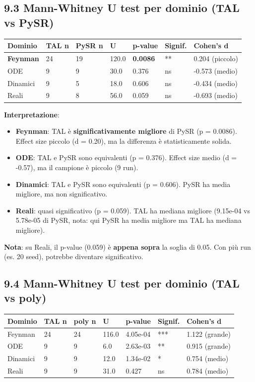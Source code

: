 \documentclass[
]{article}
\providecommand{\tightlist}{%
  \setlength{\itemsep}{0pt}\setlength{\parskip}{0pt}}
\begin{document}
\subsection{9.3 Mann-Whitney U test per dominio (TAL vs
PySR)}\label{mann-whitney-u-test-per-dominio-tal-vs-pysr}

\begin{longtable}[]{@{}lllllll@{}}
\toprule\noalign{}
Dominio & TAL n & PySR n & U & p-value & Signif. & Cohen's d \\
\midrule\noalign{}
\endhead
\bottomrule\noalign{}
\endlastfoot
\textbf{Feynman} & 24 & 19 & 120.0 & \textbf{0.0086} & ** & 0.204
(piccolo) \\
ODE & 9 & 9 & 30.0 & 0.376 & ns & -0.573 (medio) \\
Dinamici & 9 & 5 & 18.0 & 0.606 & ns & -0.434 (medio) \\
Reali & 9 & 8 & 56.0 & 0.059 & ns & -0.693 (medio) \\
\end{longtable}

\textbf{Interpretazione}:

\begin{itemize}
\tightlist
\item
  \textbf{Feynman}: TAL è \textbf{significativamente migliore} di PySR
  (p = 0.0086). Effect size piccolo (d = 0.20), ma la differenza è
  statisticamente solida.
\item
  \textbf{ODE}: TAL e PySR sono equivalenti (p = 0.376). Effect size
  medio (d = -0.57), ma il campione è piccolo (9 run).
\item
  \textbf{Dinamici}: TAL e PySR sono equivalenti (p = 0.606). PySR ha
  media migliore, ma non significativo.
\item
  \textbf{Reali}: quasi significativo (p = 0.059). TAL ha mediana
  migliore (9.15e-04 vs 5.78e-05 di PySR, nota: qui PySR ha media
  migliore ma TAL ha mediana migliore).
\end{itemize}

\textbf{Nota}: su Reali, il p-value (0.059) è \textbf{appena sopra} la
soglia di 0.05. Con più run (es. 20 seed), potrebbe diventare
significativo.

\subsection{9.4 Mann-Whitney U test per dominio (TAL vs
poly)}\label{mann-whitney-u-test-per-dominio-tal-vs-poly}

\begin{longtable}[]{@{}lllllll@{}}
\toprule\noalign{}
Dominio & TAL n & poly n & U & p-value & Signif. & Cohen's d \\
\midrule\noalign{}
\endhead
\bottomrule\noalign{}
\endlastfoot
Feynman & 24 & 24 & 116.0 & 4.05e-04 & *** & 1.122 (grande) \\
ODE & 9 & 9 & 6.0 & 2.63e-03 & ** & 0.915 (grande) \\
Dinamici & 9 & 9 & 12.0 & 1.34e-02 & * & 0.754 (medio) \\
Reali & 9 & 9 & 31.0 & 0.427 & ns & 0.784 (medio) \\
\end{longtable}
\end{document}

